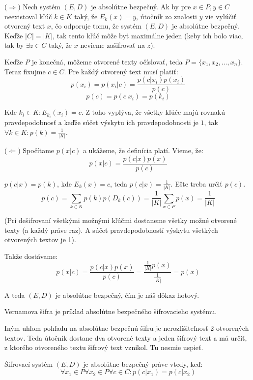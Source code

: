 \begin{dokaz}
($\Rightarrow$) Nech systém $(E,D)$ je absolútne bezpečný. Ak by pre $x \in P, y \in C$ neexistoval
kľúč $k \in K$ taký, že $E_k(x) = y$, útočník zo znalosti $y$ vie vylúčiť otvorený text $x$,
čo odporuje tomu, že systém $(E,D)$ je absolútne bezpečný. 
Keďže $|C|=|K|$, tak tento kľúč môže byť maximálne jeden (keby ich bolo viac, tak by $\exists z \in C$ taký, že
$x$ nevieme zašifrovať na $z$). 

Keďže $P$ je konečná, môžeme otvorené texty očíslovať, teda $P = \{ x_1, x_2, \dots, x_n\}$. 
Teraz fixujme $c \in C$. Pre každý otvorený text musí platiť:
$$p(x_i) = p(x_i | c) = \frac{p(c | x_i) p(x_i)}{p(c)}$$
$$p(c) = p(c | x_i) = p(k_i)$$

Kde $k_i \in K\colon E_{k_i}(x_i)=c$. Z toho vyplýva, že všetky kľúče majú rovnakú pravdepodobnosť a keďže
súčet výskytu ich pravdepodobnosti je $1$, tak $\forall k \in K\colon p(k) = \frac{1}{|K|}$.

($\Leftarrow$) Spočítame $p(x|c)$ a ukážeme, že definícia platí. Vieme, že:
$$p(x|c) = \frac{p(c|x)p(x)}{p(c)}$$

$p(c|x) = p(k)$, kde $E_k(x)=c$, teda $p(c|x) = \frac{1}{|K|}$. Ešte treba určiť $p(c)$.
$$p(c) = \displaystyle\sum_{k \in K} p(k)p(D_k(c)) = \frac{1}{|K|} \displaystyle\sum_{x \in P} p(x) = \frac{1}{|K|}$$

(Pri dešifrovaní všetkými možnými kľúčmi dostaneme všetky možné otvorené texty (a každý práve raz). A súčet pravdepodobností
výskytu všetkých otvorených textov je 1).

Takže dostávame:
$$p(x|c) = \frac{p(c|x)p(x)}{p(c)} = \frac{\frac{1}{|K|} p(x)}{\frac{1}{|K|}} = p(x)$$

A teda $(E,D)$ je absolútne bezpečný, čím je náš dôkaz hotový.

\end{dokaz}

\begin{priklad}
Vernamova šifra je príklad absolútne bezpečného šifrovacieho systému.
\end{priklad}

Iným uhlom pohľadu na absolútne bezpečnú šifru je nerozlíšiteľnosť 2 otvorených textov. 
Teda útočník dostane dva otvorené texty a jeden šifrový text a má určiť, z ktorého otvoreného
textu šifrový text vznikol. Tu nesmie uspieť.

\begin{veta}
Šifrovací systém $(E,D)$ je absolútne bezpečný práve vtedy, keď:
$$\forall x_1 \in P \forall x_2 \in P \forall c \in C\colon p(c|x_1)=p(c|x_2)$$
\end{veta}

